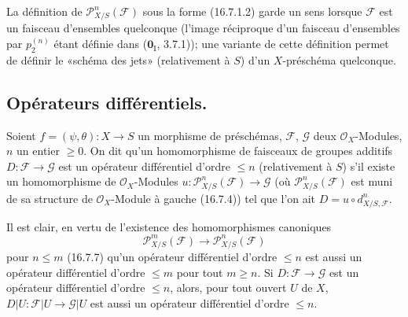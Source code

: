 \begin{remark}[16.7.10]
\label{IV.16.7.10}
La définition de $\mathscr{P}_{X/S}^n(\mathscr{F})$ sous la forme (16.7.1.2)
garde un sens lorsque $\mathscr{F}$ est un faisceau d'ensembles quelconque
(l'image réciproque d'un faisceau d'ensembles par $p_2^{(n)}$ étant définie
dans ($\mathbf{0}_{\mathrm I}$, 3.7.1)); une variante de cette définition permet de
définir le «schéma des jets» (relativement à $S$) d'un $X$-préschéma
quelconque.
\end{remark}

\subsection{Opérateurs différentiels\texorpdfstring{\protect\footnotemark}{}.}

\begin{definition}[16.8.1]
Soient $f=(\psi,\theta):X\to S$ un morphisme de préschémas,
$\mathscr{F}$, $\mathscr{G}$ deux $\mathcal{O}_X$-Modules, $n$ un entier
$\geq0$. On dit qu'un homomorphisme de faisceaux de groupes additifs
$D:\mathscr{F}\to\mathscr{G}$ est un opérateur différentiel d'ordre
$\leq n$ (relativement à $S$) s'il existe un homomorphisme de
$\mathcal{O}_X$-Modules
$u:\mathscr{P}_{X/S}^n(\mathscr{F})\to\mathscr{G}$ (où
$\mathscr{P}_{X/S}^n(\mathscr{F})$ est muni de sa structure de
$\mathcal{O}_X$-Module à gauche \textup{(16.7.4)}) tel que l'on ait
$D=u\circ d_{X/S,\mathscr{F}}^n$.
\end{definition}

Il est clair, en vertu de l'existence des homomorphismes canoniques
\[
  \mathscr{P}_{X/S}^m(\mathscr{F})
  \longrightarrow\mathscr{P}_{X/S}^n(\mathscr{F})
\]
pour $n\leq m$ (16.7.7) qu'un opérateur différentiel d'ordre $\leq n$ est
aussi un opérateur différentiel d'ordre $\leq m$ pour tout $m\geq n$. Si
$D:\mathscr{F}\to\mathscr{G}$ est un opérateur différentiel d'ordre
$\leq n$, alors, pour tout ouvert $U$ de $X$,
$D|U:\mathscr{F}|U\to\mathscr{G}|U$ est aussi un opérateur différentiel
d'ordre $\leq n$.


